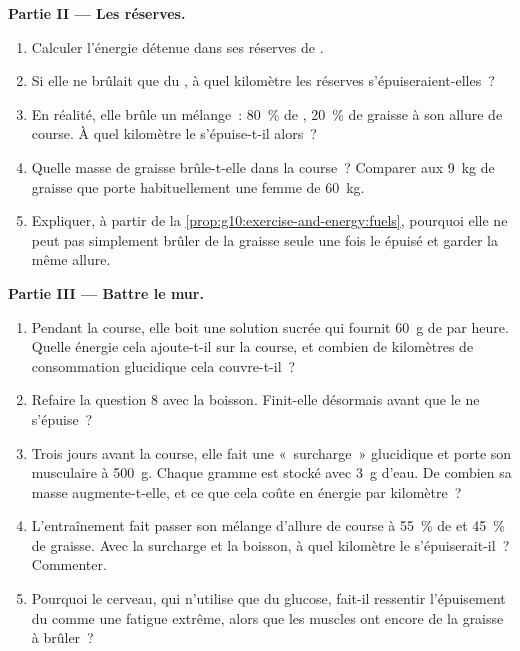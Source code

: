 \begin{problem}
\medskip
\noindent\textbf{Partie II --- Les réserves.}
\begin{enumerate}[resume]
  \item Calculer l'énergie détenue dans ses réserves de .
  \item Si elle ne brûlait que du , à quel kilomètre les
        réserves s'épuiseraient-elles~?
  \item En réalité, elle brûle un mélange~: 80~\% de , 20~\%
        de graisse à son allure de course. À quel kilomètre le
         s'épuise-t-il alors~?
  \item Quelle masse de graisse brûle-t-elle dans la course~? Comparer
        aux \qty{9}{kg} de graisse que porte habituellement une femme
        de \qty{60}{kg}.
  \item Expliquer, à partir de la
        \cref{prop:g10:exercise-and-energy:fuels}, pourquoi elle ne
        peut pas simplement brûler de la graisse seule une fois le
         épuisé et garder la même allure.
\end{enumerate}

\medskip
\noindent\textbf{Partie III --- Battre le mur.}
\begin{enumerate}[resume]
  \item Pendant la course, elle boit une solution sucrée qui fournit
        \qty{60}{g} de  par heure. Quelle énergie cela
        ajoute-t-il sur la course, et combien de kilomètres de
        consommation glucidique cela couvre-t-il~?
  \item Refaire la question 8 avec la boisson. Finit-elle désormais
        avant que le  ne s'épuise~?
  \item Trois jours avant la course, elle fait une «~surcharge~»
        glucidique et porte son  musculaire à \qty{500}{g}.
        Chaque gramme est stocké avec \qty{3}{g} d'eau. De combien sa
        masse augmente-t-elle, et ce que cela coûte en énergie par
        kilomètre~?
  \item L'entraînement fait passer son mélange d'allure de course à
        55~\% de  et 45~\% de graisse. Avec la surcharge et la
        boisson, à quel kilomètre le  s'épuiserait-il~?
        Commenter.
  \item Pourquoi le cerveau, qui n'utilise que du glucose, fait-il
        ressentir l'épuisement du  comme une fatigue extrême,
        alors que les muscles ont encore de la graisse à brûler~?
\end{enumerate}


\end{problem}
